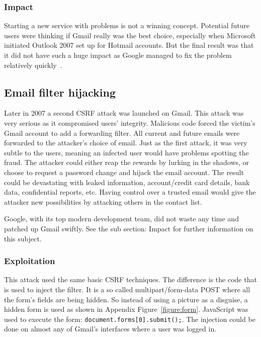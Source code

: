 \documentclass[a4paper,11pt,openany]{report}
\begin{document}
  \subsubsection{Impact}
  Starting a new service with problems is not a winning concept. Potential future users were thinking if Gmail 
  really was the best choice, especially when Microsoft initiated Outlook 2007 set up for Hotmail accounts. 
  But the final result was that it did not have such a huge impact as Google managed to fix the problem relatively
  quickly~\cite{techcrunch}.
  
  \subsection{Email filter hijacking}
  Later in 2007 a second CSRF attack was launched on Gmail. This attack was very serious as it compromised 
  users' integrity. Malicious code forced the victim's Gmail account to add a forwarding filter. All current 
  and future emails were forwarded to the attacker's choice of email. Just as the first attack, it was very 
  subtle to the users, meaning an infected user would have problems spotting the fraud. The attacker could 
  either reap the rewards by lurking in the shadows, or choose to request a password change and hijack the 
  email account. The result could be devastating with leaked information, account/credit card details, bank 
  data, confidential reports, etc. Having control over a trusted email would give the attacker new possibilities 
  by attacking others in the contact list.
  
  Google, with its top modern development team, did not waste any time and patched up Gmail swiftly. See the
  sub section: Impact for further information on this subject.
  
  \subsubsection{Exploitation}
  This attack used the same basic CSRF techniques. The difference is the code that is used to inject the filter.
  It is a so called multipart/form-data POST where all the form's fields are being hidden. So instead of using
  a picture as a disguise, a hidden form is used as shown in Appendix Figure~\ref{figure:form}. JavaScript was 
  used to execute the form: \texttt{document.forms[0].submit();}. The injection could be done on almost any of 
  Gmail's interfaces where a user was logged in.
  
\end{document}
